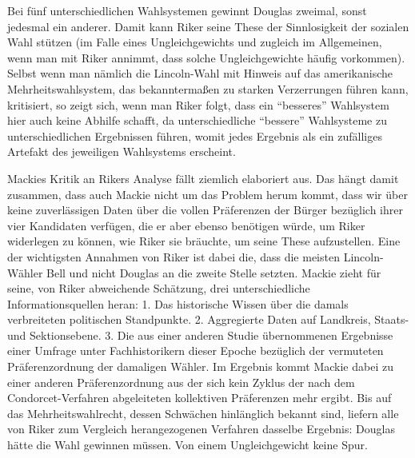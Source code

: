 Bei fünf unterschiedlichen Wahlsystemen gewinnt Douglas zweimal, sonst jedesmal
ein anderer. Damit kann Riker seine These der Sinnlosigkeit der
sozialen Wahl stützen (im Falle eines Ungleichgewichts und zugleich im
Allgemeinen, wenn man mit Riker annimmt, dass solche Ungleichgewichte häufig
vorkommen). Selbst wenn man nämlich die Lincoln-Wahl mit Hinweis auf das
amerikanische Mehrheitswahlsystem, das bekanntermaßen zu starken Verzerrungen
führen kann, kritisiert, so zeigt sich, wenn man Riker folgt, dass ein ``besseres''
Wahlsystem hier auch keine Abhilfe schafft, da unterschiedliche ``bessere''
Wahlsysteme zu unterschiedlichen Ergebnissen führen, womit jedes Ergebnis als
ein zufälliges Artefakt des jeweiligen Wahlsystems erscheint. 

Mackies Kritik an Rikers Analyse fällt ziemlich elaboriert aus. Das hängt damit
zusammen, dass auch Mackie nicht um das Problem herum kommt, dass wir über keine
zuverlässigen Daten über die vollen Präferenzen der Bürger bezüglich ihrer vier
Kandidaten verfügen, die er aber ebenso benötigen würde, um Riker widerlegen zu
können, wie Riker sie bräuchte, um seine These aufzustellen. Eine der wichtigsten
Annahmen von Riker ist dabei die, dass die meisten Lincoln-Wähler Bell und nicht
Douglas an die zweite Stelle setzten. Mackie zieht für seine, von Riker
abweichende Schätzung, drei unterschiedliche Informationsquellen heran: 1. Das
historische Wissen über die damals verbreiteten politischen Standpunkte. 2.
Aggregierte Daten auf Landkreis, Staats- und Sektionsebene. 3. Die aus einer
anderen Studie übernommenen Ergebnisse einer Umfrage unter Fachhistorikern
dieser Epoche bezüglich der vermuteten Präferenzordnung der damaligen Wähler.
\cite[S. 277]{mackie:2003} Im Ergebnis kommt Mackie dabei zu einer anderen 
Präferenzordnung aus der sich kein Zyklus der nach dem
Condorcet-Verfahren abgeleiteten kollektiven Präferenzen mehr ergibt. Bis auf
das Mehrheitswahlrecht, dessen Schwächen hinlänglich bekannt sind, liefern alle
von Riker zum Vergleich herangezogenen Verfahren dasselbe Ergebnis: Douglas
hätte die Wahl gewinnen müssen. Von einem Ungleichgewicht keine Spur.

